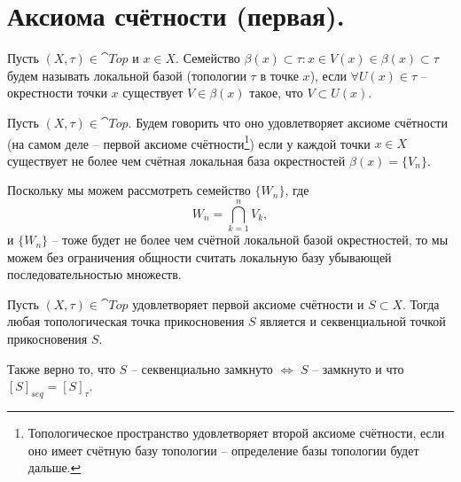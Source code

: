 \section{Аксиома счётности (первая).}
\begin{definition}
    Пусть $(X, \tau) \in \cat{Top}$ и $x \in X$.
    Семейство $\beta(x) \subset \tau\colon x \in V(x) \in \beta(x) \subset \tau$ будем называть локальной базой (топологии $\tau$ в точке $x$), если $\forall U(x) \in \tau$ -- окрестности точки $x$ существует $V \in \beta(x)$ такое, что $V \subset U(x)$.
\end{definition}
\begin{definition}
    Пусть $(X, \tau) \in \cat{Top}$.
    Будем говорить что оно удовлетворяет аксиоме счётности (на самом деле -- первой аксиоме счётности\footnote{Топологическое пространство удовлетворяет второй аксиоме счётности, если оно имеет счётную базу топологии -- определение базы топологии будет дальше.})
    если у каждой точки $x \in X$ существует не более чем счётная локальная база окрестностей $\beta(x) = \{V_n\}$.
\end{definition}
\begin{note}
    Поскольку мы можем рассмотреть семейство $\{W_n\}$, где
    \[
        W_n = \bigcap_{k = 1}^{n} V_k,
    \]
    и $\{W_n\}$ -- тоже будет не более чем счётной локальной базой окрестностей, то мы можем без ограничения общности считать локальную базу убывающей последовательностью множеств.
\end{note}
\begin{proposition}
    Пусть $(X, \tau) \in \cat{Top}$ удовлетворяет первой аксиоме счётности и $S \subset X$.
    Тогда любая топологическая точка прикосновения $S$ является и секвенциальной точкой прикосновения $S$.

    Также верно то, что $S$ -- секвенциально замкнуто $\Longleftrightarrow$ $S$ -- замкнуто и что $[S]_{seq} = [S]_{\tau}$.
\end{proposition}
